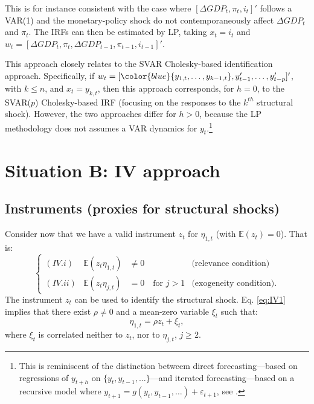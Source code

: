 \documentclass[
  12pt,
]{book}
\theoremstyle{definition}
\theoremstyle{definition}
\theoremstyle{definition}
\theoremstyle{definition}
\theoremstyle{remark}
\begin{document}
This is for instance consistent with the case where \([\Delta GDP_t, \pi_t,i_t]'\) follows a VAR(1) and the monetary-policy shock do not contemporaneously affect \(\Delta GDP_t\) and \(\pi_t\). The IRFs can then be estimated by LP, taking \(x_t = i_t\) and \(w_t = [\Delta GDP_t,\pi_t,\Delta GDP_{t-1}, \pi_{t-1},i_{t-1}]'\).

This approach closely relates to the SVAR Cholesky-based identification approach. Specifically, if \(w_t = [\color{blue}{y_{1,t},\dots,y_{k-1,t}}, y_{t-1}',\dots,y_{t-p}']'\), with \(k\le n\), and \(x_t = y_{k,t}\), then this approach corresponds, for \(h=0\), to the SVAR(\(p\)) Cholesky-based IRF (focusing on the responses to the \(k^{th}\) structural shock). However, the two approaches differ for \(h>0\), because the LP methodology does not assumes a VAR dynamics for \(y_t\).\footnote{This is reminiscent of the distinction betweem direct forecasting---based on regressions of \(y_{t+h}\) on \(\{y_t,y_{t-1},\dots\}\)---and iterated forecasting---based on a recursive model where \(y_{t+1} = g(y_t,y_{t-1},\dots)+\varepsilon_{t+1}\), see \citet{Marcellino_et_al_2006}.}

\hypertarget{situation-b-iv-approach}{%
\section{Situation B: IV approach}\label{situation-b-iv-approach}}

\hypertarget{instruments-proxies-for-structural-shocks}{%
\subsection{Instruments (proxies for structural shocks)}\label{instruments-proxies-for-structural-shocks}}

Consider now that we have a valid instrument \(z_t\) for \(\eta_{1,t}\) (with \(\mathbb{E}(z_t)=0\)). That is:
\begin{equation}
\left\{
\begin{array}{llll}
(IV.i) & \mathbb{E}(z_t \eta_{1,t}) &\ne 0 & \mbox{(relevance condition)} \\
(IV.ii) & \mathbb{E}(z_t \eta_{j,t}) &= 0 \quad \mbox{for } j>1 & \mbox{(exogeneity condition).}
\end{array}\right.\label{eq:IV1}
\end{equation}
The instrument \(z_t\) can be used to identify the structural shock. Eq. \eqref{eq:IV1} implies that there exist \(\rho \ne 0\) and a mean-zero variable \(\xi_t\) such that:
\[
\eta_{1,t} = \rho z_t + \xi_t,
\]
where \(\xi_t\) is correlated neither to \(z_t\), nor to \(\eta_{j,t}\), \(j\ge2\).
\end{document}
